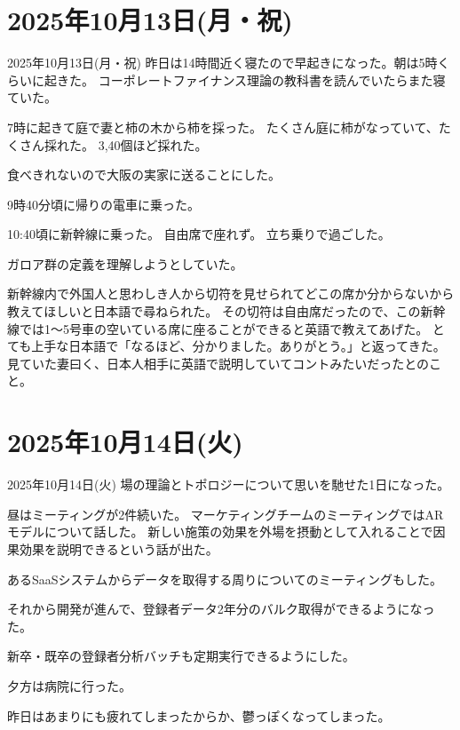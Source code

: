\documentclass[dvipdfmx, autodetect-engine, aspectratio=169, 10.5pt]{beamer}
\begin{document}
\section{2025年10月13日(月・祝)}

\begin{frame}{2025年10月13日(月・祝)}
	昨日は14時間近く寝たので早起きになった。朝は5時くらいに起きた。
	コーポレートファイナンス理論の教科書を読んでいたらまた寝ていた。

	7時に起きて庭で妻と柿の木から柿を採った。
	たくさん庭に柿がなっていて、たくさん採れた。
	3,40個ほど採れた。

	食べきれないので大阪の実家に送ることにした。

	9時40分頃に帰りの電車に乗った。

	10:40頃に新幹線に乗った。
	自由席で座れず。
	立ち乗りで過ごした。

	ガロア群の定義を理解しようとしていた。

	新幹線内で外国人と思わしき人から切符を見せられてどこの席か分からないから教えてほしいと日本語で尋ねられた。
	その切符は自由席だったので、この新幹線では1〜5号車の空いている席に座ることができると英語で教えてあげた。
	とても上手な日本語で「なるほど、分かりました。ありがとう。」と返ってきた。
	見ていた妻曰く、日本人相手に英語で説明していてコントみたいだったとのこと。
\end{frame}

\section{2025年10月14日(火)}

\begin{frame}{2025年10月14日(火)}
	場の理論とトポロジーについて思いを馳せた1日になった。

	昼はミーティングが2件続いた。
	マーケティングチームのミーティングではARモデルについて話した。
	新しい施策の効果を外場を摂動として入れることで因果効果を説明できるという話が出た。

	あるSaaSシステムからデータを取得する周りについてのミーティングもした。

	それから開発が進んで、登録者データ2年分のバルク取得ができるようになった。

	新卒・既卒の登録者分析バッチも定期実行できるようにした。

	夕方は病院に行った。

	昨日はあまりにも疲れてしまったからか、鬱っぽくなってしまった。
\end{frame}
\end{document}
